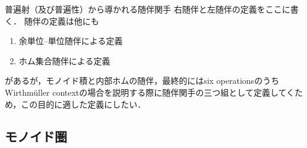 \documentclass[type_judgement.tex]{subfiles}
\begin{document}
\begin{defn}[Category（圏）]
\begin{defn}

\end{defn}

\begin{defn}[Adjunction（随伴）]
普遍射（及び普遍性）から導かれる随伴関手
右随伴と左随伴の定義をここに書く．
随伴の定義は他にも
\begin{enumerate}
    \item 余単位--単位随伴による定義
    \item ホム集合随伴による定義
\end{enumerate}
があるが，モノイド積と内部ホムの随伴，最終的にはsix operationsのうちWirthmüller contextの場合を説明する際に随伴関手の三つ組として定義してくため，この目的に適した定義にしたい．
\end{defn}

\begin{defn}

\end{defn}

\subsection{モノイド圏}
\end{defn}
\end{document}
